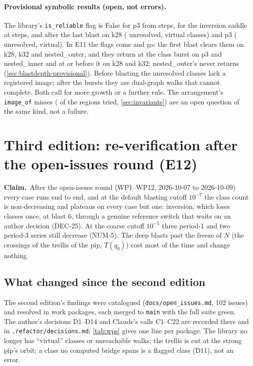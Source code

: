 \documentclass[11pt,a4paper]{article}
\newcommand{\claim}{\par\smallskip\noindent\textbf{Claim.}~}
\newcommand{\code}[1]{\texttt{#1}}
\begin{document}
\paragraph{Provisional symbolic results (open, not errors).} The
library's \code{is\_reliable} flag is False for p3 from
\NumDepthUnreliableMinPThree{} steps, for the inversion saddle at
\NumDepthNumericsMaxInversion{} steps, and after the last blast on k28
(\NumBlastUnresolvedKTwoEight{} unresolved, \NumBlastVirtualKTwoEight{}
virtual classes) and p3 (\NumBlastUnresolvedPThree{} unresolved,
\NumBlastVirtualPThree{} virtual). In E11 the flags come and go: the first
blast clears them on k28, k32 and nested\_outer, and they return at the
class burst on p3 and nested\_inner and at or before it on k28 and k32;
nested\_outer's never returns (\cref{sec:blastdepth-provisional}). Before
blasting the unresolved classes lack a registered image; after the bursts
they are dual-graph walks that cannot complete. Both call for more
growth or a further rule. The arrangement's \code{image\_of} misses
(\NumArrImageMissing{} of the regions tried, \cref{sec:invariants}) are an
open question of the same kind, not a failure.

\section{Third edition: re-verification after the open-issues round (E12)}
\label{sec:thirdedition}

\claim After the open-issues round (WP1--WP12, 2026-10-07 to 2026-10-09)
every case runs end to end, and at the default blasting cutoff $10^{-7}$
the class count is non-decreasing and plateaus on every case but one:
inversion, which loses classes once, at blast 6, through a genuine
reference switch that waits on an author decision (DEC-25). At the coarse
cutoff $10^{-5}$ three period-1 and two period-3 series still decrease
(NUM-5). The deep blasts past the freeze of $N$ (the crossings of the
trellis of the pip, $T(q_0)$) cost most of the time and change nothing.

\subsection{What changed since the second edition}

The second edition's findings were catalogued (\code{docs/open\_issues.md},
102 issues) and resolved in work packages, each merged to \code{main} with
the full suite green. The author's decisions D1--D14 and Claude's calls
C1--C22 are recorded there and in \code{.refactor/decisions.md};
\cref{tab:wps} gives one line per package. The library no longer has
``virtual'' classes or unreachable walks; the trellis is cut at the strong
pip's orbit; a class no computed bridge spans is a flagged class (D11), not
an error.
\end{document}
